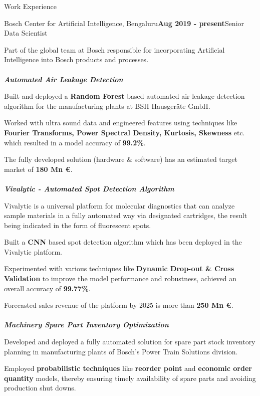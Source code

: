 \documentclass{resume}
\begin{document}
\begin{rSection}{Work Experience}
\begin{rSubsection}{\large Bosch Center for Artificial Intelligence, Bengaluru}{\textbf{\large Aug 2019 - present}}{\large Senior Data Scientist}{}

 \item Part of the global team at Bosch responsible for incorporating Artificial Intelligence into Bosch products and processes.\\\\
{\textbf{\textit{Automated Air Leakage Detection}}}
 \item Built and deployed a \textbf{Random Forest} based automated air leakage detection algorithm for the manufacturing plants at BSH Hausgeräte GmbH.
 \item Worked with ultra sound data and engineered features using techniques like \textbf{Fourier Transforms, Power Spectral Density, Kurtosis, Skewness} etc. which resulted in a model accuracy of \textbf{99.2\%}.
 \item The fully developed solution (hardware \& software) has an estimated target market of \textbf{180 Mn \euro{}}.\\\\
{\textbf{\textit{Vivalytic - Automated Spot Detection Algorithm}}}
 \item Vivalytic is a universal platform for molecular diagnostics that can analyze sample materials in a fully automated way via designated cartridges, the result being indicated in the form of fluorescent spots.
 \item Built a \textbf{CNN} based spot detection algorithm which has been deployed in the Vivalytic platform.
 \item Experimented with various techniques like \textbf{Dynamic Drop-out \& Cross Validation} to improve the model performance and robustness, achieved an overall accuracy of \textbf{99.77\%}.
 \item Forecasted sales revenue of the platform by 2025 is more than \textbf{250 Mn \euro{}}.\\\\
{\textbf{\textit{Machinery Spare Part Inventory Optimization}}}
 \item Developed and deployed a fully automated solution for spare part stock inventory planning in manufacturing plants of Bosch's Power Train Solutions division.
  \item Employed \textbf{probabilistic techniques} like \textbf{reorder point } and \textbf{economic order quantity} models, thereby ensuring timely availability of spare parts and avoiding production shut downs.

\end{rSubsection}
\end{rSection}
\end{document}
